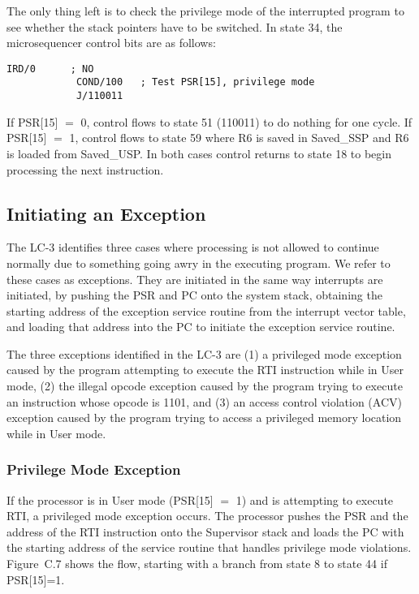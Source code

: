 \documentclass{patt}
\begin{document}
The only thing left is to check the privilege mode of the interrupted
program to see whether the stack pointers have to be switched.  In
state 34, the microsequencer control bits are as follows:

\begin{lstlisting}[style=intext]
            IRD/0      ; NO
            COND/100   ; Test PSR[15], privilege mode
            J/110011

\end{lstlisting}

If PSR[15] $=$ 0, control flows to state 51 (110011) to do nothing for
one cycle.  If PSR[15] $=$ 1, control flows to state 59 where R6 is saved
in Saved\_SSP and R6 is loaded from Saved\_USP.  In both cases control
returns to state 18 to begin processing the next instruction.

\subsection{Initiating an Exception}

The LC-3 identifies three cases where processing is not allowed to
continue normally due to something going awry in the executing program.
We refer to these cases as exceptions.  They are initiated in the same way
interrupts are initiated, by pushing the PSR and PC onto the system stack,
obtaining the starting address of the exception service routine from the
interrupt vector table, and loading that address into the PC to initiate the
exception service routine.

The three exceptions identified in the LC-3 are (1) a privileged mode exception
caused by the program attempting to execute the RTI instruction while in User
mode, (2) the illegal opcode exception caused by the program trying to execute
an instruction whose opcode is 1101, and (3) an access control violation (ACV)
exception caused by the program trying to access a privileged memory location 
while in User mode.

\subsubsection{Privilege Mode Exception}

If the processor is in User mode (PSR[15] $=$ 1) and is 
attempting to execute RTI, a privileged mode exception occurs.  
The processor pushes the PSR and the address of the RTI instruction 
onto the Supervisor stack and loads the PC with the starting address of 
the service routine that handles privilege mode violations.  Figure~C.7
shows the flow, starting with a branch from state 8 to state 44 if PSR[15]=1.
\end{document}
